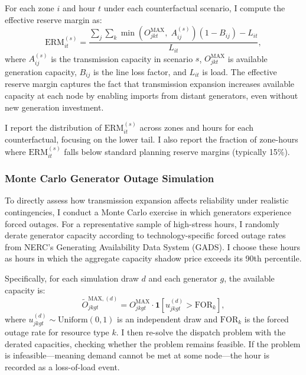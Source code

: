 \documentclass[12pt]{article}
\begin{document}
For each zone $i$ and hour $t$ under each counterfactual scenario, I compute the effective reserve margin as:
\begin{equation}
    \text{ERM}_{it}^{(s)} = \frac{\sum_{j} \sum_{k} \min\left(O^{\text{MAX}}_{jkt},\; A_{ij}^{(s)}\right)(1 - B_{ij}) - L_{it}}{L_{it}},
\end{equation}
where $A_{ij}^{(s)}$ is the transmission capacity in scenario $s$, $O^{\text{MAX}}_{jkt}$ is available generation capacity, $B_{ij}$ is the line loss factor, and $L_{it}$ is load. The effective reserve margin captures the fact that transmission expansion increases available capacity at each node by enabling imports from distant generators, even without new generation investment.

I report the distribution of $\text{ERM}_{it}^{(s)}$ across zones and hours for each counterfactual, focusing on the lower tail. I also report the fraction of zone-hours where $\text{ERM}_{it}^{(s)}$ falls below standard planning reserve margins (typically 15\%).

\subsubsection{Monte Carlo Generator Outage Simulation}

To directly assess how transmission expansion affects reliability under realistic contingencies, I conduct a Monte Carlo exercise in which generators experience forced outages. For a representative sample of high-stress hours, I randomly derate generator capacity according to technology-specific forced outage rates from NERC's Generating Availability Data System (GADS). I choose these hours as hours in which the aggregate capacity shadow price exceeds its 90th percentile.

Specifically, for each simulation draw $d$ and each generator $g$, the available capacity is:
\begin{equation}
    \tilde{O}^{\text{MAX},(d)}_{jkgt} = O^{\text{MAX}}_{jkgt} \cdot \mathbf{1}\left[u_{jkgt}^{(d)} > \text{FOR}_k\right],
\end{equation}
where $u_{jkgt}^{(d)} \sim \text{Uniform}(0,1)$ is an independent draw and $\text{FOR}_k$ is the forced outage rate for resource type $k$. I then re-solve the dispatch problem with the derated capacities, checking whether the problem remains feasible. If the problem is infeasible---meaning demand cannot be met at some node---the hour is recorded as a loss-of-load event.
\end{document}
